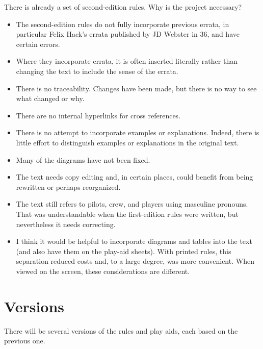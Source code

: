 \documentclass[10pt]{article}
\begin{document}
There is already a set of second-edition rules. Why is the project necessary?
\begin{itemize}
    \item The second-edition rules do not fully incorporate previous errata, in particular Felix Hack’s errata published by JD Webster in {\APJ} 36, and have certain errors.
    \item Where they incorporate errata, it is often inserted literally rather than changing the text to include the sense of the errata.
    \item There is no traceability. Changes have been made, but there is no way to see what changed or why.
    \item There are no internal hyperlinks for cross references.
    \item There is no attempt to incorporate examples or explanations. Indeed, there is little effort to distinguish examples or explanations in the original text.
    \item Many of the diagrams have not been fixed.
    \item The text needs copy editing and, in certain places, could benefit from being rewritten or perhaps reorganized.
    \item The text still refers to pilots, crew, and players using masculine pronouns. That was understandable when the first-edition rules were written, but nevertheless it needs correcting.
    \item I think it would be helpful to incorporate diagrams and tables into the text (and also have them on the play-aid sheets). With printed rules, this separation reduced costs and, to a large degree, was more convenient. When viewed on the screen, these considerations are different.
\end{itemize}

\section*{Versions}

There will be several versions of the rules and play aids, each based on the previous one.
\end{document}
